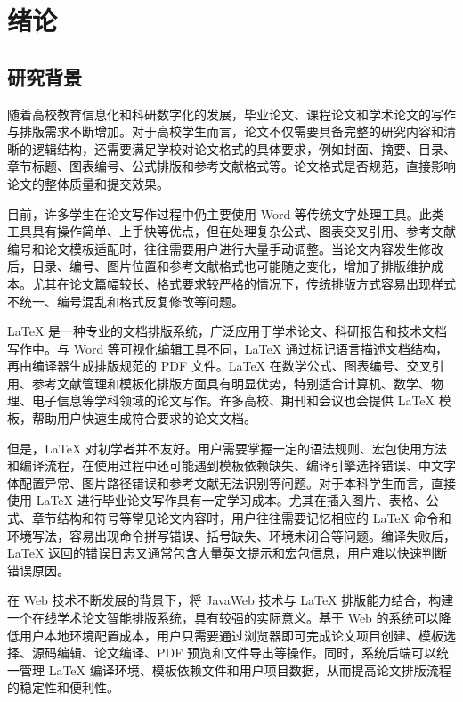 \documentclass{xduugthesis}
\begin{document}
\chapter{绪论}

\section{研究背景}

随着高校教育信息化和科研数字化的发展，毕业论文、课程论文和学术论文的写作与排版需求不断增加。对于高校学生而言，论文不仅需要具备完整的研究内容和清晰的逻辑结构，还需要满足学校对论文格式的具体要求，例如封面、摘要、目录、章节标题、图表编号、公式排版和参考文献格式等。论文格式是否规范，直接影响论文的整体质量和提交效果。

目前，许多学生在论文写作过程中仍主要使用 Word 等传统文字处理工具。此类工具具有操作简单、上手快等优点，但在处理复杂公式、图表交叉引用、参考文献编号和论文模板适配时，往往需要用户进行大量手动调整\cite{gong2009automating}。当论文内容发生修改后，目录、编号、图片位置和参考文献格式也可能随之变化，增加了排版维护成本。尤其在论文篇幅较长、格式要求较严格的情况下，传统排版方式容易出现样式不统一、编号混乱和格式反复修改等问题。

LaTeX 是一种专业的文档排版系统，广泛应用于学术论文、科研报告和技术文档写作中\cite{zhou2022latex,lamport1994latex}。与 Word 等可视化编辑工具不同，LaTeX 通过标记语言描述文档结构，再由编译器生成排版规范的 PDF 文件。LaTeX 在数学公式、图表编号、交叉引用、参考文献管理和模板化排版方面具有明显优势，特别适合计算机、数学、物理、电子信息等学科领域的论文写作\cite{tan2023latex}。许多高校、期刊和会议也会提供 LaTeX 模板，帮助用户快速生成符合要求的论文文档。

但是，LaTeX 对初学者并不友好。用户需要掌握一定的语法规则、宏包使用方法和编译流程，在使用过程中还可能遇到模板依赖缺失、编译引擎选择错误、中文字体配置异常、图片路径错误和参考文献无法识别等问题\cite{wang2019latex}。对于本科学生而言，直接使用 LaTeX 进行毕业论文写作具有一定学习成本。尤其在插入图片、表格、公式、章节结构和符号等常见论文内容时，用户往往需要记忆相应的 LaTeX 命令和环境写法，容易出现命令拼写错误、括号缺失、环境未闭合等问题。编译失败后，LaTeX 返回的错误日志又通常包含大量英文提示和宏包信息，用户难以快速判断错误原因。

在 Web 技术不断发展的背景下，将 JavaWeb 技术与 LaTeX 排版能力结合，构建一个在线学术论文智能排版系统，具有较强的实际意义\cite{li2025javaweb}。基于 Web 的系统可以降低用户本地环境配置成本，用户只需要通过浏览器即可完成论文项目创建、模板选择、源码编辑、论文编译、PDF 预览和文件导出等操作。同时，系统后端可以统一管理 LaTeX 编译环境、模板依赖文件和用户项目数据，从而提高论文排版流程的稳定性和便利性。
\end{document}
